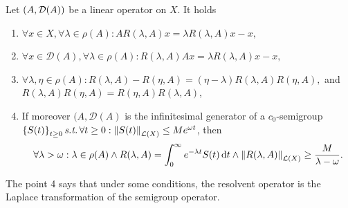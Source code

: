 \documentclass{article}
\begin{document}
\begin{lemma}
    Let $\qty(A, \mathcal{D}(A))$ be a linear operator on $X$. It holds

    \begin{enumerate}
	\item $\forall x \in X, \forall \lambda \in \rho(A): AR(\lambda, A)x = \lambda R(\lambda, A)x - x,$
	\item $\forall x \in \mathcal{D}(A), \forall \lambda \in \rho(A): R(\lambda, A)Ax = \lambda R(\lambda, A)x - x,$
	\item $\forall \lambda, \eta \in \rho(A): R(\lambda, A) - R(\eta, A) = (\eta - \lambda) R(\lambda, A) R(\eta, A),$ and $R(\lambda, A) R(\eta, A) = R(\eta, A) R(\lambda, A)$,
	\item If moreover $(A, \mathcal{D}(A)$ is the infinitesimal generator of a $c_0$-semigroup $\qty{S(t)}_{t\geq 0} \, \text{\textit{s.t.}} \, \forall t\geq 0: \norm{S(t)}_{\mathcal{L}(X)} \leq Me^{\omega t}$, then
		\[
			\forall \lambda > \omega: \lambda \in \rho(A) \wedge R(\lambda, A) = \int_0^\infty e^{-\lambda t} S(t) \dd{t} \wedge \norm{R(\lambda, A)}_{\mathcal{L}(X)} \geq \frac{M}{\lambda- \omega}.
		\]
    \end{enumerate}
\end{lemma}

\begin{remark}
    The point 4 says that under some conditions, the resolvent operator is the Laplace transformation of the semigroup operator.
\end{remark}
\end{document}

